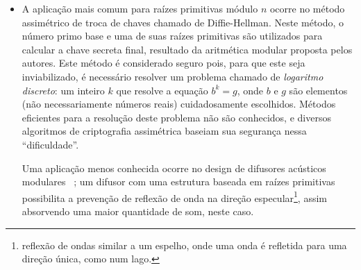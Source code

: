 \documentclass{../sftex/sftex}
\begin{document}
\begin{itemize}
\item A aplicação mais comum para raízes primitivas módulo $n$ ocorre no
método assimétrico de troca de chaves chamado de Diffie-Hellman. Neste método, o
número primo base e uma de suas raízes primitivas são utilizados para calcular a
chave secreta final, resultado da aritmética modular proposta pelos autores.
Este método é considerado seguro pois, para que este seja inviabilizado, é
necessário resolver um problema chamado de \emph{logaritmo discreto}: um inteiro
$k$ que resolve a equação $b^k = g$, onde $b$ e $g$ são elementos (não
necessariamente números reais) cuidadosamente escolhidos. Métodos eficientes
para a resolução deste problema não são conhecidos, e diversos algoritmos de
criptografia assimétrica baseiam sua segurança nessa ``dificuldade''.

Uma aplicação menos conhecida ocorre no design de difusores acústicos modulares
~\cite{Walker:1990}; um difusor com uma estrutura baseada em raízes primitivas
possibilita a prevenção de reflexão de onda na direção
especular\footnote{reflexão de ondas similar a um espelho, onde uma onda é
refletida para uma direção única, como num lago.}, assim absorvendo uma maior
quantidade de som, neste caso.

\end{itemize}



\end{document}

